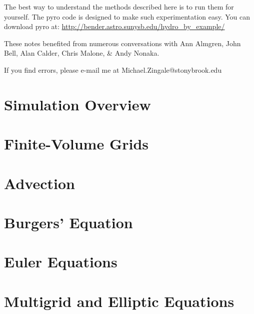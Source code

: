 \documentclass[11pt]{book}
\begin{document}
The best way to understand the methods described here is to run
them for yourself.  The {\sf pyro} code is designed to make such
experimentation easy.  You can download {\sf pyro} at: 
\url{http://bender.astro.sunysb.edu/hydro_by_example/}

These notes benefited from numerous conversations with Ann Almgren,
John Bell, Alan Calder, Chris Malone, \& Andy Nonaka.

If you find errors, please e-mail me at Michael.Zingale@stonybrook.edu

\clearpage

\mainmatter


\chapter{Simulation Overview}



\chapter{Finite-Volume Grids}



\chapter{Advection}



\chapter{Burgers' Equation}



\chapter{Euler Equations}



\chapter{Multigrid and Elliptic Equations}
\end{document}
